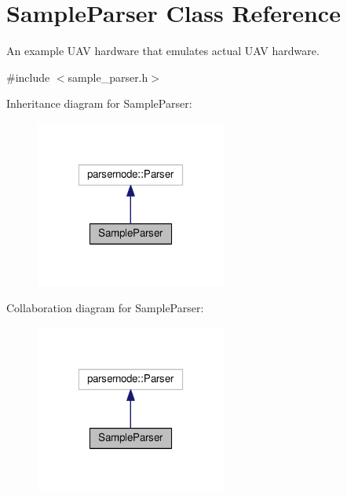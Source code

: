 \hypertarget{classSampleParser}{\section{Sample\-Parser Class Reference}
\label{classSampleParser}
}


An example U\-A\-V hardware that emulates actual U\-A\-V hardware.  




{\ttfamily \#include $<$sample\-\_\-parser.\-h$>$}



Inheritance diagram for Sample\-Parser\-:\nopagebreak
\begin{figure}[H]
\begin{center}
\leavevmode
\includegraphics[width=178pt]{classSampleParser__inherit__graph}
\end{center}
\end{figure}


Collaboration diagram for Sample\-Parser\-:\nopagebreak
\begin{figure}[H]
\begin{center}
\leavevmode
\includegraphics[width=178pt]{classSampleParser__coll__graph}
\end{center}
\end{figure}
